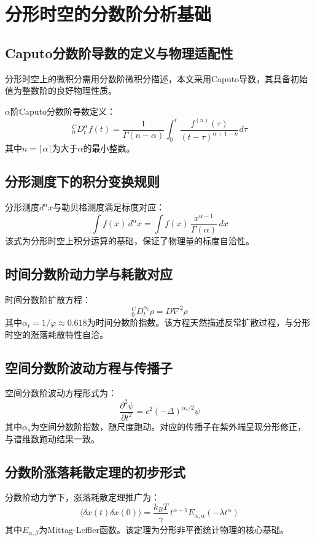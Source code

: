 \documentclass[12pt,a4paper,twocolumn]{article}
\renewcommand{\phi}{\varphi}
\begin{document}
\section{分形时空的分数阶分析基础}
\label{sec:fractal_analysis}

\subsection{Caputo分数阶导数的定义与物理适配性}
分形时空上的微积分需用分数阶微积分描述，本文采用Caputo导数，其具备初始值为整数阶的良好物理性质。

$\alpha$阶Caputo分数阶导数定义：
\[
{}_{0}^{C}D_t^\alpha f(t) = \frac{1}{\Gamma(n-\alpha)} \int_0^t \frac{f^{(n)}(\tau)}{(t-\tau)^{\alpha+1-n}} d\tau
\]
其中$n = \lceil \alpha \rceil$为大于$\alpha$的最小整数。

\subsection{分形测度下的积分变换规则}
分形测度$d^\alpha x$与勒贝格测度满足标度对应：
\[
\int f(x)\,d^\alpha x = \int f(x)\, \frac{x^{\alpha-1}}{\Gamma(\alpha)}\,dx
\]
该式为分形时空上积分运算的基础，保证了物理量的标度自洽性。

\subsection{时间分数阶动力学与耗散对应}
时间分数阶扩散方程：
\[
{}_{0}^{C}D_t^{\alpha_t} \rho = D \nabla^2 \rho
\]
其中$\alpha_t = 1/\phi \approx 0.618$为时间分数阶指数。该方程天然描述反常扩散过程，与分形时空的涨落耗散特性自洽。

\subsection{空间分数阶波动方程与传播子}
空间分数阶波动方程形式为：
\[
\frac{\partial^2 \psi}{\partial t^2} = c^2 (-\Delta)^{\alpha_s/2} \psi
\]
其中$\alpha_s$为空间分数阶指数，随尺度跑动。对应的传播子在紫外端呈现分形修正，与谱维数跑动结果一致。

\subsection{分数阶涨落耗散定理的初步形式}
分数阶动力学下，涨落耗散定理推广为：
\[
\langle \delta x(t) \delta x(0) \rangle = \frac{k_B T}{\gamma} \, t^{\alpha-1} E_{\alpha,\alpha}(-\lambda t^\alpha)
\]
其中$E_{\alpha,\beta}$为Mittag-Leffler函数。该定理为分形非平衡统计物理的核心基础。
\end{document}
